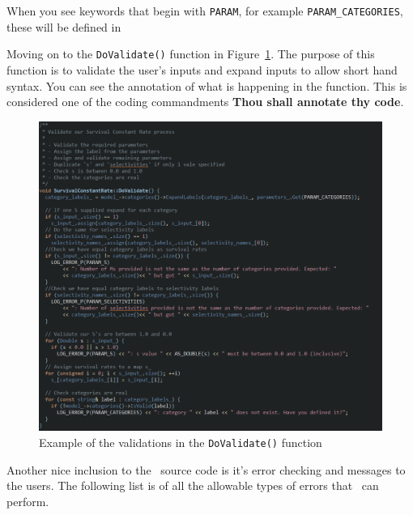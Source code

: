 When you see keywords that begin with \texttt{PARAM}, for example \texttt{PARAM\_CATEGORIES}, these will be defined in 

Moving on to the \texttt{DoValidate()} function in Figure~\ref{fig:validate}. The purpose of this function is to validate the user's inputs and expand inputs to allow short hand syntax. You can see the annotation of what is happening in the function. This is considered one of the coding commandments \textbf{Thou shall annotate thy code}.

\begin{figure}[H]
	\centering
	\includegraphics[scale=0.6]{Figures/validate.png}
	\caption{Example of the validations in the \texttt{DoValidate()} function}\label{fig:validate}
\end{figure}

Another nice inclusion to the \CNAME\ source code is it's error checking and messages to the users. The following list is of all the allowable types of errors that \CNAME\ can perform.

